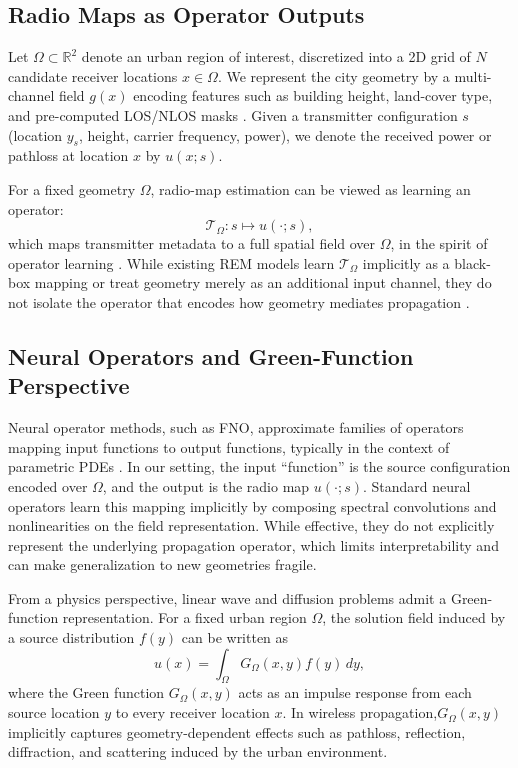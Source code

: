 \documentclass{article}
\begin{document}
\subsection{Radio Maps as Operator Outputs}
Let $\Omega \subset \mathbb{R}^2$ denote an urban region of interest, discretized into a 2D grid of $N$ candidate receiver locations $x \in \Omega$. We represent the city geometry by a multi-channel field $g(x)$ encoding features such as building height, land-cover type, and pre-computed LOS/NLOS masks \cite{li2022urbangeometry,biljecki2015models3d}. Given a transmitter configuration $s$ (location $y_s$, height, carrier frequency, power), we denote the received power or pathloss at location $x$ by $u(x; s)$. 

For a fixed geometry $\Omega$, radio-map estimation can be viewed as learning an operator:
\begin{equation}
\mathcal{T}_\Omega : s \mapsto u(\cdot; s),
\end{equation}
which maps transmitter metadata to a full spatial field over $\Omega$, in the spirit of operator learning \cite{li2020fourier,lu2021deeponet,li2021physics}. While existing REM models learn $\mathcal{T}_\Omega$ implicitly as a black-box mapping or treat geometry merely as an additional input channel, they do not isolate the operator that encodes how geometry mediates propagation \cite{romero2022radiomap,feng2025survey,chen2023gnnrem,fang2025radioformer}.

\subsection{Neural Operators and Green-Function Perspective}

Neural operator methods, such as FNO, approximate families of operators mapping input functions to output functions, typically in the context of parametric PDEs \cite{li2020fourier,li2021physics,lu2021deeponet,kochkov2024climateneo,llanes2024scatteringno}. In our setting, the input ``function'' is the source configuration encoded over $\Omega$, and the output is the radio map $u(\cdot; s)$. Standard neural operators learn this mapping implicitly by composing spectral convolutions and nonlinearities on the field representation. While effective, they do not explicitly represent the underlying propagation operator, which limits interpretability and can make generalization to new geometries fragile.

From a physics perspective, linear wave and diffusion problems admit a Green-function representation. For a fixed urban region $\Omega$, the solution field induced by a source distribution $f(y)$ can be written as
\begin{equation}
u(x) = \int_\Omega G_\Omega(x, y) f(y)\, dy,
\label{eq:green_continuous}
\end{equation}
where the Green function $G_\Omega(x, y)$ acts as an impulse response from each source location $y$ to every receiver location $x$. In wireless propagation,$G_\Omega(x, y)$ implicitly captures geometry-dependent effects such as pathloss, reflection, diffraction, and scattering induced by the urban environment.
\end{document}
